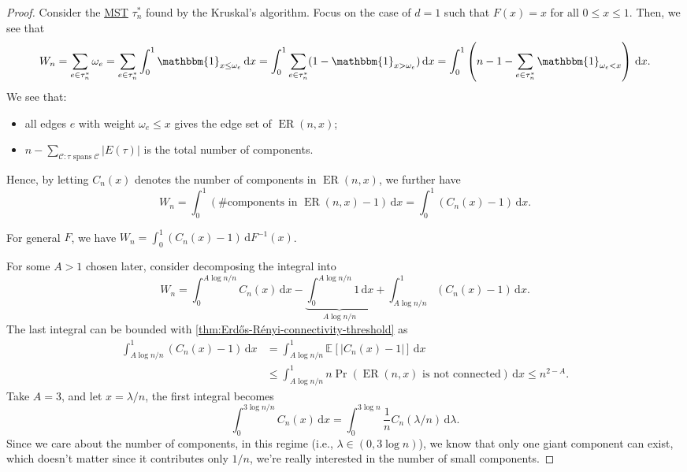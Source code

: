 \begin{proof}
	Consider the \hyperref[prb:MST]{MST} \(\tau _n^{\ast} \) found by the Kruskal's algorithm. Focus on the case of \(d = 1\) such that \(F(x) = x\) for all \(0 \leq x \leq 1\). Then, we see that
	\[
		W_n
		= \sum_{e \in \tau _n^{\ast} } \omega _e
		= \sum_{e \in \tau _n^{\ast} } \int_{0}^{1} \mathbbm{1}_{x \leq \omega _e} \,\mathrm{d}x
		= \int_{0}^{1} \sum_{e \in \tau _n^{\ast} } (1 - \mathbbm{1}_{x > \omega _e} ) \,\mathrm{d}x
		= \int_{0}^{1} \left( n-1 - \sum_{e \in \tau _n^{\ast} } \mathbbm{1}_{\omega _e < x} \right) \,\mathrm{d}x .
	\]
	We see that:
	\begin{itemize}
		\item all edges \(e\) with weight \(\omega _e \leq x\) gives the edge set of \(\operatorname{ER}(n, x) \);
		\item \(n - \sum_{\mathcal{C} \colon \tau \text{ spans } \mathcal{C} } \lvert E(\tau ) \rvert \) is the total number of components.
	\end{itemize}
	Hence, by letting \(C_n(x)\) denotes the number of components in \(\operatorname{ER}(n, x) \), we further have
	\[
		W_n
		= \int_{0}^{1} \left( \text{\#components in } \operatorname{ER}(n, x) - 1 \right) \,\mathrm{d}x
		= \int_{0}^{1} (C_n(x) - 1) \,\mathrm{d}x .
	\]
	\begin{note}
		For general \(F\), we have \(W_n = \int_{0}^{1} (C_n(x) - 1) \,\mathrm{d}F^{-1} (x) \).
	\end{note}

	For some \(A > 1\) chosen later, consider decomposing the integral into
	\[
		W_n
		= \int_{0}^{A \log n / n} C_n(x) \,\mathrm{d}x
		- \underbrace{\int_{0}^{A \log n / n} 1 \,\mathrm{d}x}_{A \log n / n}
		+ \int_{A \log n / n}^{1} (C_n(x) - 1) \,\mathrm{d}x .
	\]
	The last integral can be bounded with \autoref{thm:Erdős-Rényi-connectivity-threshold} as
	\[
		\begin{split}
			\int_{A \log n / n}^{1} (C_n(x) - 1) \,\mathrm{d}x
			 & = \int_{A \log n / n}^{1} \mathbb{E}_{}[\lvert C_n(x) - 1 \rvert ]  \,\mathrm{d}x                                  \\
			 & \leq \int_{A \log n / n}^{1} n \Pr_{}\left(\operatorname{ER}(n, x) \text{ is not connected} \right)  \,\mathrm{d}x
			\leq n^{2 - A}.
		\end{split}
	\]
	Take \(A = 3\), and let \(x = \lambda / n\), the first integral becomes
	\[
		\int_{0}^{3 \log n / n} C_n(x) \,\mathrm{d}x
		= \int_{0}^{3 \log n} \frac{1}{n} C_n(\lambda / n) \,\mathrm{d}\lambda .
	\]
	Since we care about the number of components, in this regime (i.e., \(\lambda \in (0, 3 \log n)\)), we know that only one giant component can exist, which doesn't matter since it contributes only \(1 / n\), we're really interested in the number of small components.


\end{proof}
